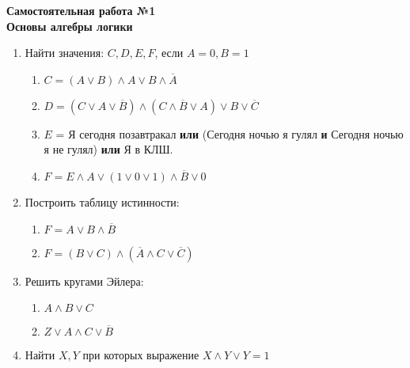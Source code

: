 



    \begin{center}
        \textbf{
            Самостоятельная работа №1\\
            Основы алгебры логики}
    \end{center}

    \begin{enumerate}
        \item Найти значения: $C, D, E, F$, если $A = 0, B = 1$\\
        \begin{enumerate}
            \item $C = (A \vee B) \wedge A \vee B \wedge \overline A$\\

            \item $D = (C \vee A \vee \overline B) \wedge (C \wedge \overline B \vee A) \vee B \vee \overline C$\\

            \item $E$ = Я сегодня позавтракал \textbf{или} (Сегодня ночью я гулял \textbf{и} Сегодня ночью я не гулял) \textbf{или} Я в КЛШ.\\

            \item $F = E \wedge A \vee (1 \vee 0 \vee 1) \wedge \overline B \vee 0$\\

        \end{enumerate}

        \item Построить таблицу истинности:
        \begin{enumerate}
            \item $F = A \vee B \wedge \overline B$

            \item $F = (B \vee C) \wedge (\overline A \wedge C \vee \overline C)$
        \end{enumerate}

        \item Решить кругами Эйлера:
        \begin{enumerate}
            \item $A \wedge B \vee C$

            \item $Z \vee A \wedge C \vee \overline B$
        \end{enumerate}

        \item Найти $X, Y$ при которых выражение $X \wedge Y \vee Y = 1$
    \end{enumerate}

